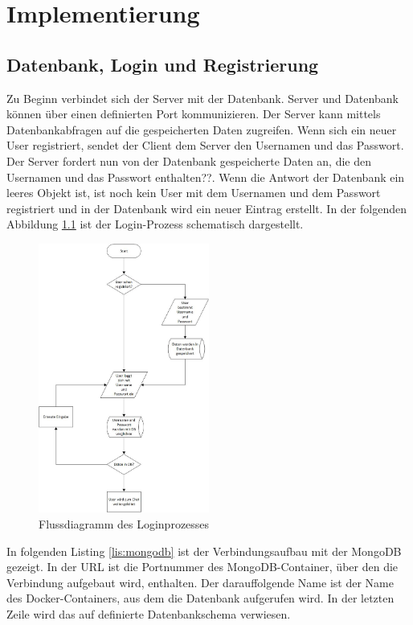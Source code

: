 
\chapter{Implementierung}\label{cha:Implementierung}
\section{Datenbank, Login und Registrierung}\label{Datenbank}
Zu Beginn verbindet sich der Server mit der Datenbank. Server und Datenbank können über einen definierten Port kommunizieren. Der Server kann mittels Datenbankabfragen auf die gespeicherten Daten zugreifen. Wenn sich ein neuer User registriert, sendet der Client dem Server den Usernamen und das Passwort. Der Server fordert nun von der Datenbank gespeicherte Daten an, die den Usernamen und das Passwort enthalten??. Wenn die Antwort der Datenbank ein leeres Objekt ist, ist noch kein User mit dem Usernamen und dem Passwort registriert und in der Datenbank wird ein neuer Eintrag erstellt. 
In der folgenden Abbildung \ref{fig:login} ist der Login-Prozess schematisch dargestellt.
\begin{figure}[H]
\centering
\includegraphics[width=0.5\textwidth]{images/login.jpg}
\caption{Flussdiagramm des Loginprozesses}
\label{fig:login}
\end{figure}

In folgenden Listing \ref{lis:mongodb} ist der Verbindungsaufbau mit der MongoDB gezeigt. In der URL ist die Portnummer des MongoDB-Container, über den die Verbindung aufgebaut wird, enthalten. Der darauffolgende Name ist der Name des Docker-Containers, aus dem die Datenbank aufgerufen wird.
In der letzten Zeile wird das auf definierte Datenbankschema verwiesen. 

